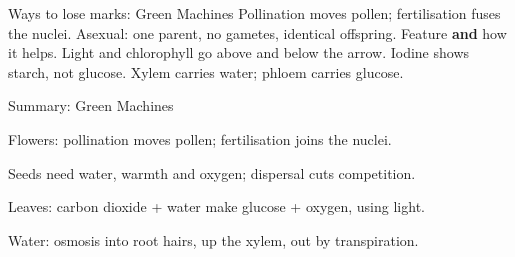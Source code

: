 \documentclass[aspectratio=169,11pt,xcolor=table]{beamer}
\begin{document}
\begin{frame}{Ways to lose marks: Green Machines}
\relax
{} Pollination moves pollen; fertilisation fuses the nuclei.
 Asexual: one parent, no gametes, identical offspring.
 Feature \textbf{and} how it helps.
 Light and chlorophyll go above and below the arrow.
 Iodine shows starch, not glucose.
 Xylem carries water; phloem carries glucose.
\end{frame}

\begin{frame}{Summary: Green Machines}
\relax
\vspace{4mm}
{\renewcommand\baselinestretch{1.3}\sSum
Flowers: pollination moves pollen; fertilisation joins the nuclei.\par\vspace{3mm}
Seeds need water, warmth and oxygen; dispersal cuts competition.\par\vspace{3mm}
Leaves: carbon dioxide + water make glucose + oxygen, using light.\par\vspace{3mm}
Water: osmosis into root hairs, up the xylem, out by transpiration.\par}
\end{frame}
\end{document}
